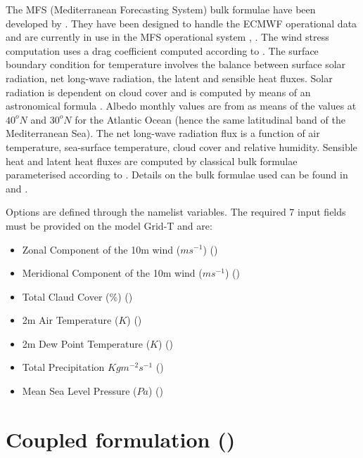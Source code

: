 \documentclass[../tex_main/NEMO_manual]{subfiles}
\begin{document}
The MFS (Mediterranean Forecasting System) bulk formulae have been developed by
 \citet{Castellari_al_JMS1998}. 
They have been designed to handle the ECMWF operational data and are currently 
in use in the MFS operational system \citep{Tonani_al_OS08}, \citep{Oddo_al_OS09}.
The wind stress computation uses a drag coefficient computed according to \citet{Hellerman_Rosenstein_JPO83}.
The surface boundary condition for temperature involves the balance between surface solar radiation,
net long-wave radiation, the latent and sensible heat fluxes.
Solar radiation is dependent on cloud cover and is computed by means of
an astronomical formula \citep{Reed_JPO77}. Albedo monthly values are from \citet{Payne_JAS72} 
as means of the values at $40^{o}N$ and $30^{o}N$ for the Atlantic Ocean (hence the same latitudinal
band of the Mediterranean Sea). The net long-wave radiation flux
\citep{Bignami_al_JGR95} is a function of
air temperature, sea-surface temperature, cloud cover and relative humidity.
Sensible heat and latent heat fluxes are computed by classical
bulk formulae parameterised according to \citet{Kondo1975}.
Details on the bulk formulae used can be found in \citet{Maggiore_al_PCE98} and \citet{Castellari_al_JMS1998}.

Options are defined through the   namelist variables.
The required 7 input fields must be provided on the model Grid-T and  are:
\begin{itemize}
\item          Zonal Component of the 10m wind ($ms^{-1}$)  ()
\item          Meridional Component of the 10m wind ($ms^{-1}$)  ()
\item          Total Claud Cover (\%)  ()
\item          2m Air Temperature ($K$) ()
\item          2m Dew Point Temperature ($K$)  ()
\item          Total Precipitation ${Kg} m^{-2} s^{-1}$ ()
\item          Mean Sea Level Pressure (${Pa}$) ()
\end{itemize}
\section{Coupled formulation (\protect{})}
\label{sec:SBC_cpl}
\end{document}
